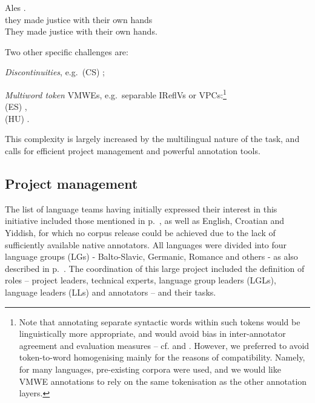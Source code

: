 \documentclass[output=paper,
modfonts,
]{langscibook}
\begin{document}
\begin{sitem}
\begin{sitem}
\ea \label{pt:take-into-hands}
\settowidth {}
\gll Ales      . \\
they made justice with their own hands\\ 
\glt They made justice with their own hands. 
\z

    \end{sitem}
\end{sitem}
Two other specific challenges are:
\begin{sitem}
\item \emph{Discontinuities}, e.g.\ (CS) ;
\item \emph{Multiword token} VMWEs, e.g.\ separable IReflVs or VPCs:\footnote{Note that annotating separate syntactic words within such tokens would be linguistically more appropriate, and would avoid bias in inter-annotator agreement and evaluation measures -- cf.  and \citep{MWEWorkshop}. However, we preferred to avoid token-to-word homogenising mainly for the reasons of compatibility. Namely, for many languages, pre-existing corpora were used, and we would like VMWE annotations to rely on the same tokenisation as the other annotation layers.}\\ (ES) ,\\ (HU) .%

\end{sitem}

\noindent
This complexity is largely increased by the multilingual nature of the task, and calls for efficient project management and powerful annotation tools. 

\subsection{Project management}
\label{sec:management}
%
The list of language teams having initially expressed their interest in this initiative included those mentioned in p.~\pageref{language-groups}, as well as English, Croatian and Yiddish, for which no corpus release could be achieved due to the lack of sufficiently available native annotators. All languages were divided into four language groups (LGs) - Balto-Slavic, Germanic, Romance and others - as also described in p.~\pageref{language-groups}. 
%
The coordination of this large project included the definition of roles -- project leaders, technical experts, language group leaders (LGLs), language leaders (LLs) and annotators -- and their tasks.
\end{document}
